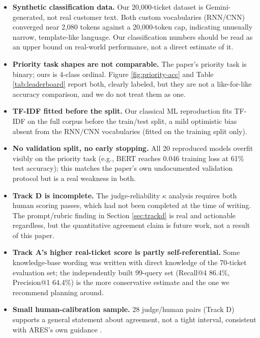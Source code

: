 \documentclass[conference]{IEEEtran}
\begin{document}
\begin{itemize}
\item \textbf{Synthetic classification data.} Our 20,000-ticket dataset is Gemini-generated, not real customer text. Both custom vocabularies (RNN/CNN) converged near 2,080 tokens against a 20,000-token cap, indicating unusually narrow, template-like language. Our classification numbers should be read as an upper bound on real-world performance, not a direct estimate of it.
\item \textbf{Priority task shapes are not comparable.} The paper's priority task is binary; ours is 4-class ordinal. Figure \ref{fig:priority-acc} and Table \ref{tab:leaderboard} report both, clearly labeled, but they are not a like-for-like accuracy comparison, and we do not treat them as one.
\item \textbf{TF-IDF fitted before the split.} Our classical ML reproduction fits TF-IDF on the full corpus before the train/test split, a mild optimistic bias absent from the RNN/CNN vocabularies (fitted on the training split only).
\item \textbf{No validation split, no early stopping.} All 20 reproduced models overfit visibly on the priority task (e.g., BERT reaches 0.046 training loss at 61\% test accuracy); this matches the paper's own undocumented validation protocol but is a real weakness in both.
\item \textbf{Track D is incomplete.} The judge-reliability $\kappa$ analysis requires both human scoring passes, which had not been completed at the time of writing. The prompt/rubric finding in Section \ref{sec:trackd} is real and actionable regardless, but the quantitative agreement claim is future work, not a result of this paper.
\item \textbf{Track A's higher real-ticket score is partly self-referential.} Some knowledge-base wording was written with direct knowledge of the 70-ticket evaluation set; the independently built 99-query set (Recall@4 86.4\%, Precision@1 64.4\%) is the more conservative estimate and the one we recommend planning around.
\item \textbf{Small human-calibration sample.} 28 judge/human pairs (Track D) supports a general statement about agreement, not a tight interval, consistent with ARES's own guidance \cite{saadfalcon2024ares}.
\end{itemize}
\end{document}
